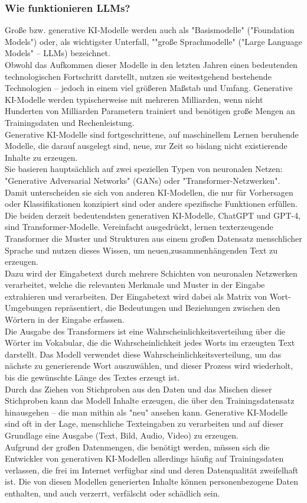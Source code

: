 \documentclass[12pt]{article}
\begin{document}
\subsubsection{Wie funktionieren LLMs?}
Große bzw. generative KI-Modelle werden auch als "Basismodelle" ("Foundation Models")
oder, als wichtigster Unterfall, ""große Sprachmodelle" ("Large Language Models" – LLMs) bezeichnet.\\
Obwohl das Aufkommen dieser Modelle in den letzten Jahren einen bedeutenden
technologischen Fortschritt darstellt, nutzen sie weitestgehend bestehende Technologien – jedoch in einem viel größeren Maßstab und Umfang. Generative KI-Modelle werden typischerweise mit mehreren Milliarden, wenn nicht Hunderten von Milliarden Parametern trainiert und benötigen große Mengen an Trainingsdaten und Rechenleistung.\\
Generative KI-Modelle sind fortgeschrittene, auf maschinellem Lernen beruhende Modelle, die darauf ausgelegt sind, neue, zur Zeit so bislang nicht existierende Inhalte zu erzeugen.\\
Sie basieren hauptsächlich auf zwei speziellen Typen von neuronalen Netzen: "Generative Adversarial Networks" (GANs) oder "Transformer-Netzwerken".\\
Damit unterscheiden sie sich von anderen KI-Modellen, die nur für Vorhersagen oder Klassifikationen konzipiert sind oder andere spezifische Funktionen erfüllen.
Die beiden derzeit bedeutendsten generativen KI-Modelle, ChatGPT und GPT-4, sind Transformer-Modelle. Vereinfacht ausgedrückt, lernen texterzeugende Transformer die Muster und Strukturen aus einem großen Datensatz menschlicher Sprache und nutzen dieses Wissen, um neuen,zusammenhängenden Text zu erzeugen.\\
%
Dazu wird der Eingabetext durch mehrere Schichten von neuronalen Netzwerken verarbeitet, welche die relevanten Merkmale und Muster in der Eingabe extrahieren und verarbeiten. Der Eingabetext wird dabei als Matrix von Wort-Umgebungen repräsentiert, die Bedeutungen und Beziehungen zwischen den Wörtern in der Eingabe erfassen.\\
Die Ausgabe des Transformers ist eine Wahrscheinlichkeitsverteilung über die Wörter im
Vokabular, die die Wahrscheinlichkeit jedes Worts im erzeugten Text darstellt. Das Modell verwendet diese Wahrscheinlichkeitsverteilung, um das nächste zu generierende Wort auszuwählen, und dieser Prozess wird wiederholt, bis die gewünschte Länge des Textes erzeugt ist.\\
%
Durch das Ziehen von Stichproben aus den Daten und das Mischen dieser Stichproben kann das Modell Inhalte erzeugen, die über den Trainingsdatensatz hinausgehen – die man mithin als "neu" ansehen kann. Generative KI-Modelle sind oft in der Lage, menschliche Texteingaben zu verarbeiten und auf dieser Grundlage eine Ausgabe (Text, Bild, Audio, Video) zu erzeugen.\\
Aufgrund der großen Datenmengen, die benötigt werden, müssen sich die Entwickler von
generativen KI-Modellen allerdings häufig auf Trainingsdaten verlassen, die frei im Internet verfügbar sind und deren Datenqualität zweifelhaft ist. Die von diesen Modellen generierten Inhalte können personenbezogene Daten enthalten, und auch verzerrt, verfälscht oder schädlich sein. \\
%
\end{document}

